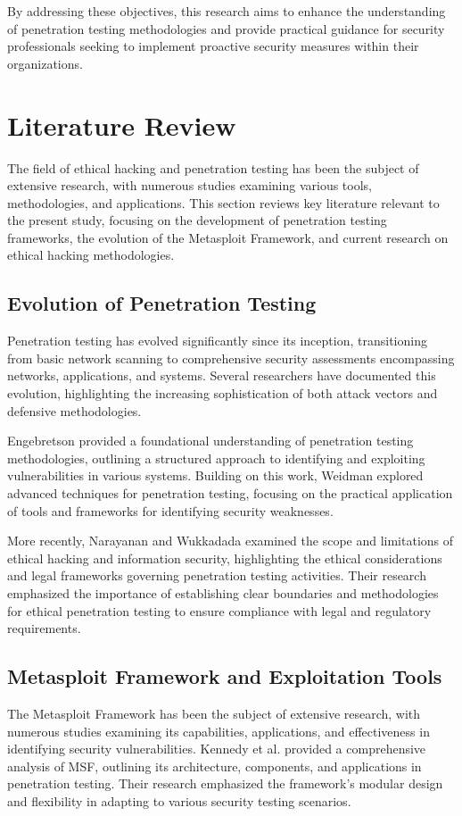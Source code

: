 \documentclass[journal,twoside]{IEEEtran}
\begin{document}
By addressing these objectives, this research aims to enhance the understanding of penetration testing methodologies and provide practical guidance for security professionals seeking to implement proactive security measures within their organizations.

\section{Literature Review}
The field of ethical hacking and penetration testing has been the subject of extensive research, with numerous studies examining various tools, methodologies, and applications. This section reviews key literature relevant to the present study, focusing on the development of penetration testing frameworks, the evolution of the Metasploit Framework, and current research on ethical hacking methodologies.

\subsection{Evolution of Penetration Testing}
Penetration testing has evolved significantly since its inception, transitioning from basic network scanning to comprehensive security assessments encompassing networks, applications, and systems. Several researchers have documented this evolution, highlighting the increasing sophistication of both attack vectors and defensive methodologies.

Engebretson \cite{engebretson2013} provided a foundational understanding of penetration testing methodologies, outlining a structured approach to identifying and exploiting vulnerabilities in various systems. Building on this work, Weidman \cite{weidman2014} explored advanced techniques for penetration testing, focusing on the practical application of tools and frameworks for identifying security weaknesses.

More recently, Narayanan and Wukkadada \cite{narayanan2021} examined the scope and limitations of ethical hacking and information security, highlighting the ethical considerations and legal frameworks governing penetration testing activities. Their research emphasized the importance of establishing clear boundaries and methodologies for ethical penetration testing to ensure compliance with legal and regulatory requirements.

\subsection{Metasploit Framework and Exploitation Tools}
The Metasploit Framework has been the subject of extensive research, with numerous studies examining its capabilities, applications, and effectiveness in identifying security vulnerabilities. Kennedy et al. \cite{kennedy2011} provided a comprehensive analysis of MSF, outlining its architecture, components, and applications in penetration testing. Their research emphasized the framework's modular design and flexibility in adapting to various security testing scenarios.
\end{document}
